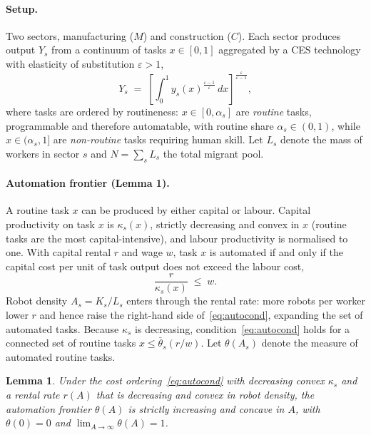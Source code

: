 \documentclass[12pt]{article}
\newtheorem{lemma}{Lemma}
\begin{document}
\paragraph{Setup.} Two sectors, manufacturing ($M$) and construction ($C$). Each sector produces output $Y_s$ from a continuum of tasks $x\in[0,1]$ aggregated by a CES technology with elasticity of substitution $\varepsilon>1$,
\begin{equation}
Y_s \;=\; \left[\int_0^1 y_s(x)^{\frac{\varepsilon-1}{\varepsilon}}\,dx\right]^{\frac{\varepsilon}{\varepsilon-1}},
\label{eq:ces}
\end{equation}
where tasks are ordered by routineness: $x\in[0,\alpha_s]$ are \emph{routine} tasks, programmable and therefore automatable, with routine share $\alpha_s\in(0,1)$, while $x\in(\alpha_s,1]$ are \emph{non-routine} tasks requiring human skill. Let $L_s$ denote the mass of workers in sector $s$ and $N=\sum_s L_s$ the total migrant pool.

\paragraph{Automation frontier (Lemma 1).} A routine task $x$ can be produced by either capital or labour. Capital productivity on task $x$ is $\kappa_s(x)$, strictly decreasing and convex in $x$ (routine tasks are the most capital-intensive), and labour productivity is normalised to one. With capital rental $r$ and wage $w$, task $x$ is automated if and only if the capital cost per unit of task output does not exceed the labour cost,
\begin{equation}
\frac{r}{\kappa_s(x)} \;\le\; w .
\label{eq:autocond}
\end{equation}
Robot density $A_s=K_s/L_s$ enters through the rental rate: more robots per worker lower $r$ and hence raise the right-hand side of~\eqref{eq:autocond}, expanding the set of automated tasks. Because $\kappa_s$ is decreasing, condition~\eqref{eq:autocond} holds for a connected set of routine tasks $x\le\bar\theta_s(r/w)$. Let $\theta(A_s)$ denote the measure of automated routine tasks.

\begin{lemma}\label{lem:theta}
Under the cost ordering~\eqref{eq:autocond} with decreasing convex $\kappa_s$ and a rental rate $r(A)$ that is decreasing and convex in robot density, the automation frontier $\theta(A)$ is strictly increasing and concave in $A$, with $\theta(0)=0$ and $\lim_{A\to\infty}\theta(A)=1$.
\end{lemma}
\end{document}

